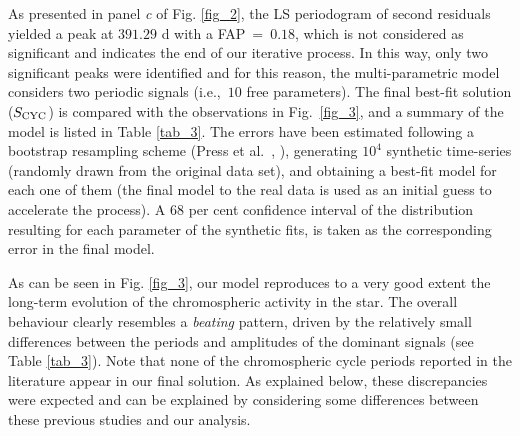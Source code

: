\documentclass[a4paper,fleqn,usenatbib]{mnras}
\begin{document}
As presented in panel \textit{c} of Fig. \ref{fig_2}, the LS periodogram of second residuals yielded a peak at $391.29$ d with a FAP~=~$0.18$, which is not considered as significant and indicates the end of our iterative process. In this way, only two significant peaks were identified and for this reason, the multi-parametric model considers two periodic signals (i.e.,~$10$ free parameters). The final best-fit solution ($S_{\rm CYC}$) is compared with the observations in Fig.~\ref{fig_3}, and a summary of the model is listed in Table \ref{tab_3}. The errors have been estimated following a bootstrap resampling scheme (Press et al.~, ), generating $10^4$ synthetic time-series (randomly drawn from the original data set), and obtaining a best-fit model for each one of them (the final model to the real data is used as an initial guess to accelerate the process). A 68 per cent confidence interval of the distribution resulting for each parameter of the synthetic fits, is taken as the corresponding error in the final model.       

As can be seen in Fig. \ref{fig_3}, our model reproduces to a very good extent the long-term evolution of the chromospheric activity in the star. The overall behaviour clearly resembles a \textit{beating} pattern, driven by the relatively small differences between the periods and amplitudes of the dominant signals (see Table \ref{tab_3}). Note that none of the chromospheric cycle periods reported in the literature appear in our final solution. As explained below, these discrepancies were expected and can be explained by considering some differences between these previous studies and our analysis. 
\end{document}
